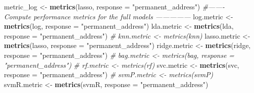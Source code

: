 \documentclass[
  10pt,
]{article}
\newenvironment{Shaded}{\begin{snugshade}}{\end{snugshade}}
\newcommand{\CommentTok}[1]{\textcolor[rgb]{0.56,0.35,0.01}{\textit{#1}}}
\newcommand{\DataTypeTok}[1]{\textcolor[rgb]{0.13,0.29,0.53}{#1}}
\newcommand{\KeywordTok}[1]{\textcolor[rgb]{0.13,0.29,0.53}{\textbf{#1}}}
\newcommand{\NormalTok}[1]{#1}
\newcommand{\StringTok}[1]{\textcolor[rgb]{0.31,0.60,0.02}{#1}}
\begin{document}
\begin{Shaded}
\begin{Highlighting}[]
{{{\NormalTok{metric_log <-}\StringTok{ }\KeywordTok{metrics}\NormalTok{(lasso, }\DataTypeTok{response =} \StringTok{"permanent_address"}\NormalTok{)}
\CommentTok{#------- Compute performance metrics for the full models ---------------}
\NormalTok{log.metric <-}\StringTok{ }\KeywordTok{metrics}\NormalTok{(log, }\DataTypeTok{response =} \StringTok{"permanent_address"}\NormalTok{)}
\NormalTok{lda.metric <-}\StringTok{ }\KeywordTok{metrics}\NormalTok{(lda, }\DataTypeTok{response =} \StringTok{"permanent_address"}\NormalTok{)}
\CommentTok{# knn.metric <- metrics(knn)}
\NormalTok{lasso.metric <-}\StringTok{ }\KeywordTok{metrics}\NormalTok{(lasso, }\DataTypeTok{response =} \StringTok{"permanent_address"}\NormalTok{)}
\NormalTok{ridge.metric <-}\StringTok{ }\KeywordTok{metrics}\NormalTok{(ridge, }\DataTypeTok{response =} \StringTok{"permanent_address"}\NormalTok{)}
\CommentTok{# bag.metric <- metrics(bag, response = "permanent_address")}
\CommentTok{# rf.metric <- metrics(rf)}
\NormalTok{svc.metric <-}\StringTok{ }\KeywordTok{metrics}\NormalTok{(svc, }\DataTypeTok{response =} \StringTok{"permanent_address"}\NormalTok{)}
\CommentTok{# svmP.metric <- metrics(svmP)}
\NormalTok{svmR.metric <-}\StringTok{ }\KeywordTok{metrics}\NormalTok{(svmR, }\DataTypeTok{response =} \StringTok{"permanent_address"}\NormalTok{)}

}}}
\end{Highlighting}
\end{Shaded}
\end{document}
